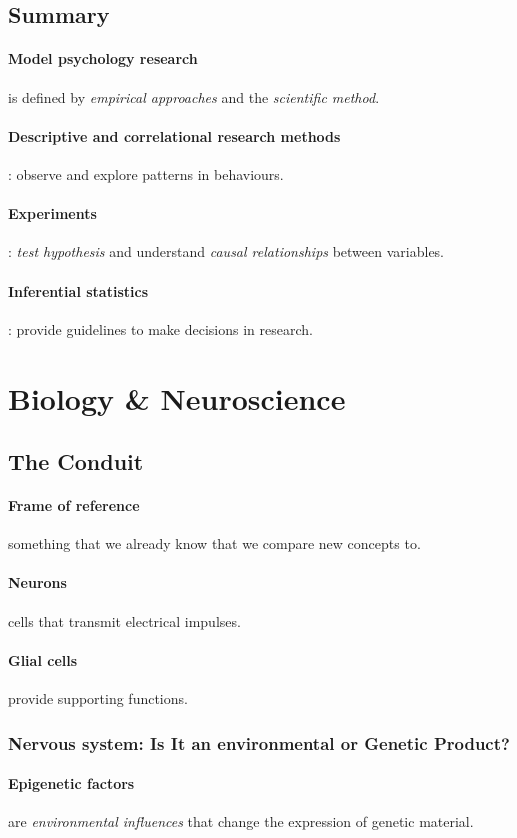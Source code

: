 \documentclass{article}
\begin{document}
 	\subsection{Summary}
 	\paragraph{Model psychology research} is defined by \emph{empirical approaches} and the \emph{scientific method}.
 	\paragraph{Descriptive and correlational research methods}: observe and explore patterns in behaviours.
 	\paragraph{Experiments}: \emph{test hypothesis} and understand \emph{causal relationships} between variables.
 	\paragraph{Inferential statistics}: provide guidelines to make decisions in research.
 	\section{Biology \& Neuroscience}
 	\subsection{The Conduit}
 	\paragraph{Frame of reference} something that we already know that we compare new concepts to.
 	\paragraph{Neurons} cells that transmit electrical impulses.
 	\paragraph{Glial cells} provide supporting functions.
 	\subsubsection{Nervous system: Is It an environmental or Genetic Product?}
 	\paragraph{Epigenetic factors} are \emph{environmental influences} that change the expression of genetic material.
\end{document}
